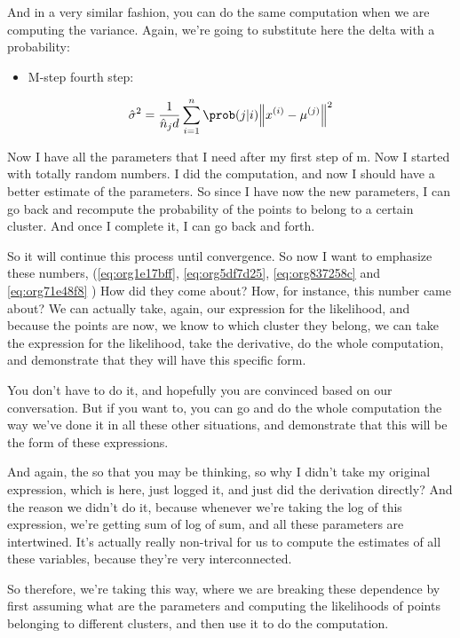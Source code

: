 \documentclass[a4paper, 12pt]{article}
\begin{document}
And in a very similar fashion, you can do the same computation when we are
computing the variance. Again, we're going to substitute here the delta with a
probability:

\begin{itemize}
\item M-step fourth step:
\end{itemize}
\begin{equation}
\label{eq:org71e48f8}
\hat{\sigma}^2 = \frac{1}{\hat{n}_jd} \sum_{i=1}^{n} \prob(j|i) \norm{x^{(i)} - \mu^{(j)}}^2
\end{equation}

Now I have all the parameters that I need after my first step of m. Now I
started with totally random numbers. I did the computation, and now I should
have a better estimate of the parameters. So since I have now the new
parameters, I can go back and recompute the probability of the points to belong
to a certain cluster. And once I complete it, I can go back and forth.

So it will continue this process until convergence. So now I want to emphasize
these numbers, (\ref{eq:org1e17bff}, \ref{eq:org5df7d25}, \ref{eq:org837258c} and \ref{eq:org71e48f8} ) How did they come about?
How, for instance, this number came about? We can actually take, again, our
expression for the likelihood, and because the points are now, we know to which
cluster they belong, we can take the expression for the likelihood, take the
derivative, do the whole computation, and demonstrate that they will have this
specific form.

You don't have to do it, and hopefully you are convinced based on our
conversation. But if you want to, you can go and do the whole computation the
way we've done it in all these other situations, and demonstrate that this will
be the form of these expressions.

And again, the so that you may be thinking, so why I didn't take my original
expression, which is here, just logged it, and just did the derivation directly?
And the reason we didn't do it, because whenever we're taking the log of this
expression, we're getting sum of log of sum, and all these parameters are
intertwined. It's actually really non-trival for us to compute the estimates of
all these variables, because they're very interconnected.

So therefore, we're taking this way, where we are breaking these dependence by
first assuming what are the parameters and computing the likelihoods of points
belonging to different clusters, and then use it to do the computation.
\end{document}
